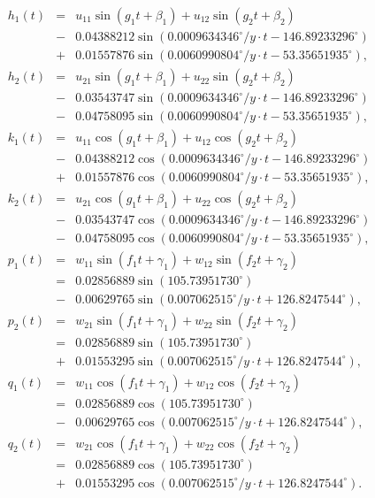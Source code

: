 \documentclass [12pt, a4paper] {article}
\begin{document}
\begin {eqnarray}
    h_1(t) 
    &=& 
    u_{11}\sin(g_1t + \beta_1) + u_{12}\sin(g_2t + \beta_2)
    \\
    &-&0.04388212\sin(0.0009634346^\circ/y\cdot t - 146.89233296^\circ)
    \\\nonumber
    &+& 0.01557876\sin(0.0060990804^\circ/y\cdot t - 53.35651935^\circ),
    \\
    h_2(t) 
    &=& 
    u_{21}\sin(g_1t + \beta_1) + u_{22}\sin(g_2t + \beta_2)
    \\
    &-&0.03543747\sin(0.0009634346^\circ/y\cdot t - 146.89233296^\circ)
    \\\nonumber
    &-&0.04758095\sin(0.0060990804^\circ/y\cdot t - 53.35651935^\circ),
    \\
    k_1(t) 
    &=& 
    u_{11}\cos(g_1t + \beta_1) + u_{12}\cos(g_2t + \beta_2)
    \\
    &-&0.04388212\cos(0.0009634346^\circ/y\cdot t - 146.89233296^\circ)
    \\\nonumber
    &+& 0.01557876\cos(0.0060990804^\circ/y\cdot t - 53.35651935^\circ),
    \\
    k_2(t) 
    &=& 
    u_{21}\cos(g_1t + \beta_1) + u_{22}\cos(g_2t + \beta_2)
    \\
    &-&0.03543747\cos(0.0009634346^\circ/y\cdot t - 146.89233296^\circ)
    \\\nonumber
    &-&0.04758095\cos(0.0060990804^\circ/y\cdot t - 53.35651935^\circ),
    \\
    p_1(t) 
    &=& 
    w_{11}\sin(f_1t + \gamma_1) + w_{12}\sin(f_2t + \gamma_2)
    \\
    &=& 
    0.02856889\sin(105.73951730^\circ)
    \\\nonumber
    &-&
    0.00629765\sin(0.007062515^\circ/y\cdot t + 126.8247544^\circ),
    \\
    p_2(t) 
    &=& 
    w_{21}\sin(f_1t + \gamma_1) + w_{22}\sin(f_2t + \gamma_2)
    \\
    &=& 
    0.02856889\sin(105.73951730^\circ)
    \\\nonumber
    &+&
    0.01553295\sin(0.007062515^\circ/y\cdot t + 126.8247544^\circ),
    \\
    q_1(t) 
    &=& 
    w_{11}\cos(f_1t + \gamma_1) + w_{12}\cos(f_2t + \gamma_2)
    \\
    &=& 
    0.02856889\cos(105.73951730^\circ)
    \\\nonumber
    &-&
    0.00629765\cos(0.007062515^\circ/y\cdot t + 126.8247544^\circ),
    \\
    q_2(t) 
    &=& 
    w_{21}\cos(f_1t + \gamma_1) + w_{22}\cos(f_2t + \gamma_2)
    \\
    &=& 
    0.02856889\cos(105.73951730^\circ)
    \\\nonumber
    &+&
    0.01553295\cos(0.007062515^\circ/y\cdot t + 126.8247544^\circ).
\end {eqnarray}
\end{document}
